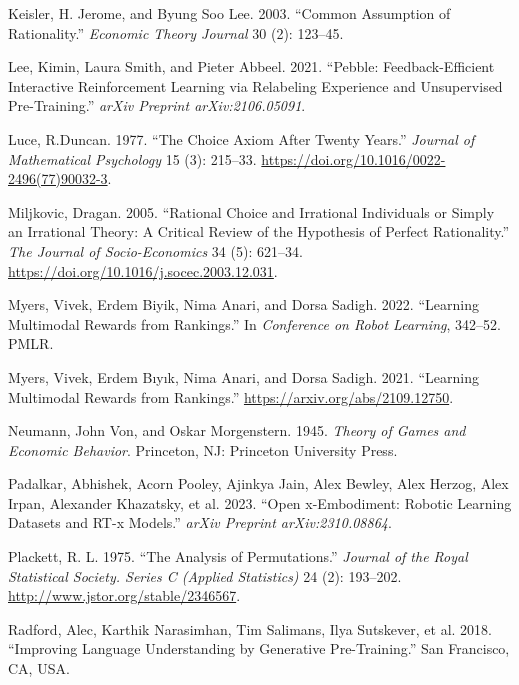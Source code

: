 \documentclass[
  letterpaper,
  numbers=noenddot,
  DIV=11]{scrreprt}
\newlength{\cslhangindent}
\newenvironment{CSLReferences}[2] %
 {\begin{list}{}{%
  \setlength{\itemindent}{0pt}
  \setlength{\leftmargin}{0pt}
  \setlength{\parsep}{0pt}
  \ifodd #1
   \setlength{\leftmargin}{\cslhangindent}
   \setlength{\itemindent}{-1\cslhangindent}
  \fi
  \setlength{\itemsep}{#2\baselineskip}}}
 {\end{list}}
\theoremstyle{definition}
\theoremstyle{plain}
\theoremstyle{plain}
\theoremstyle{remark}
\begin{document}
\begin{CSLReferences}{1}{0}
Keisler, H. Jerome, and Byung Soo Lee. 2003. {``Common Assumption of
Rationality.''} \emph{Economic Theory Journal} 30 (2): 123--45.

Lee, Kimin, Laura Smith, and Pieter Abbeel. 2021. {``Pebble:
Feedback-Efficient Interactive Reinforcement Learning via Relabeling
Experience and Unsupervised Pre-Training.''} \emph{arXiv Preprint
arXiv:2106.05091}.

Luce, R.Duncan. 1977. {``The Choice Axiom After Twenty Years.''}
\emph{Journal of Mathematical Psychology} 15 (3): 215--33.
\url{https://doi.org/10.1016/0022-2496(77)90032-3}.

Miljkovic, Dragan. 2005. {``Rational Choice and Irrational Individuals
or Simply an Irrational Theory: A Critical Review of the Hypothesis of
Perfect Rationality.''} \emph{The Journal of Socio-Economics} 34 (5):
621--34. \url{https://doi.org/10.1016/j.socec.2003.12.031}.

Myers, Vivek, Erdem Biyik, Nima Anari, and Dorsa Sadigh. 2022.
{``Learning Multimodal Rewards from Rankings.''} In \emph{Conference on
Robot Learning}, 342--52. PMLR.

Myers, Vivek, Erdem Bıyık, Nima Anari, and Dorsa Sadigh. 2021.
{``Learning Multimodal Rewards from Rankings.''}
\url{https://arxiv.org/abs/2109.12750}.

Neumann, John Von, and Oskar Morgenstern. 1945. \emph{Theory of Games
and Economic Behavior}. Princeton, NJ: Princeton University Press.

Padalkar, Abhishek, Acorn Pooley, Ajinkya Jain, Alex Bewley, Alex
Herzog, Alex Irpan, Alexander Khazatsky, et al. 2023. {``Open
x-Embodiment: Robotic Learning Datasets and RT-x Models.''} \emph{arXiv
Preprint arXiv:2310.08864}.

Plackett, R. L. 1975. {``The Analysis of Permutations.''} \emph{Journal
of the Royal Statistical Society. Series C (Applied Statistics)} 24 (2):
193--202. \url{http://www.jstor.org/stable/2346567}.

Radford, Alec, Karthik Narasimhan, Tim Salimans, Ilya Sutskever, et al.
2018. {``Improving Language Understanding by Generative Pre-Training.''}
San Francisco, CA, USA.


\end{CSLReferences}
\end{document}
